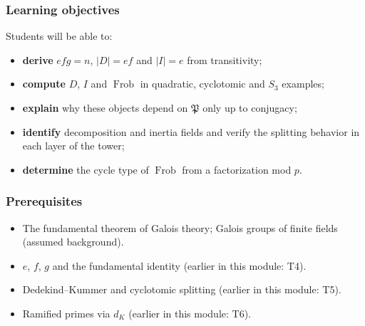 \documentclass[11pt]{article}
\newcommand{\fP}{\mathfrak{P}}
\DeclareMathOperator{\Frob}{Frob}
\begin{document}
\subsubsection*{Learning objectives}
Students will be able to:
\begin{itemize}
  \item \textbf{derive} $efg=n$, $|D|=ef$ and $|I|=e$ from transitivity;
  \item \textbf{compute} $D$, $I$ and $\Frob$ in quadratic, cyclotomic and $S_3$ examples;
  \item \textbf{explain} why these objects depend on $\fP$ only up to conjugacy;
  \item \textbf{identify} decomposition and inertia fields and verify the splitting behavior in each layer of the tower;
  \item \textbf{determine} the cycle type of $\Frob$ from a factorization mod $p$.
\end{itemize}

\subsubsection*{Prerequisites}
\begin{itemize}
  \item The fundamental theorem of Galois theory; Galois groups of finite fields (assumed background).
  \item $e$, $f$, $g$ and the fundamental identity (earlier in this module: T4).
  \item Dedekind--Kummer and cyclotomic splitting (earlier in this module: T5).
  \item Ramified primes via $d_K$ (earlier in this module: T6).
\end{itemize}
\end{document}
